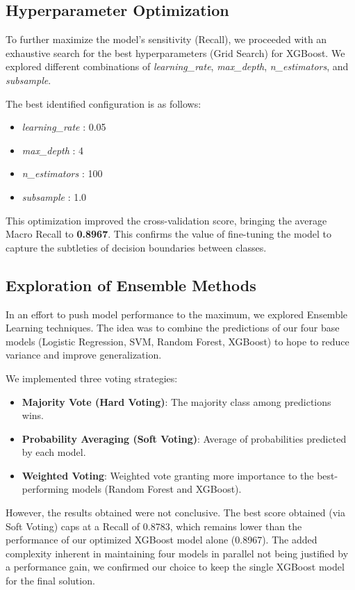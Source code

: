 \documentclass[12pt,a4paper]{article}
\begin{document}
    \subsection{Hyperparameter Optimization}
    To further maximize the model's sensitivity (Recall), we proceeded with an exhaustive search for the best hyperparameters (Grid Search) for XGBoost. We explored different combinations of \textit{learning\_rate}, \textit{max\_depth}, \textit{n\_estimators}, and \textit{subsample}.

    The best identified configuration is as follows:
    \begin{itemize}
        \item \textit{learning\_rate} : 0.05
        \item \textit{max\_depth} : 4
        \item \textit{n\_estimators} : 100
        \item \textit{subsample} : 1.0
    \end{itemize}

    This optimization improved the cross-validation score, bringing the average Macro Recall to \textbf{0.8967}. This confirms the value of fine-tuning the model to capture the subtleties of decision boundaries between classes.

    \subsection{Exploration of Ensemble Methods}
    In an effort to push model performance to the maximum, we explored Ensemble Learning techniques. The idea was to combine the predictions of our four base models (Logistic Regression, SVM, Random Forest, XGBoost) to hope to reduce variance and improve generalization.

    We implemented three voting strategies:
    \begin{itemize}
        \item \textbf{Majority Vote (Hard Voting)}: The majority class among predictions wins.
        \item \textbf{Probability Averaging (Soft Voting)}: Average of probabilities predicted by each model.
        \item \textbf{Weighted Voting}: Weighted vote granting more importance to the best-performing models (Random Forest and XGBoost).
    \end{itemize}

    However, the results obtained were not conclusive. The best score obtained (via Soft Voting) caps at a Recall of 0.8783, which remains lower than the performance of our optimized XGBoost model alone (0.8967). The added complexity inherent in maintaining four models in parallel not being justified by a performance gain, we confirmed our choice to keep the single XGBoost model for the final solution.
\end{document}
